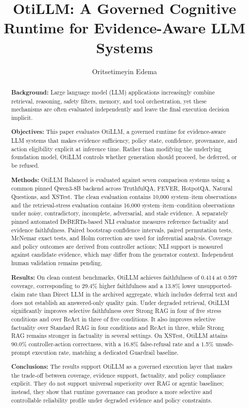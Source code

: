\documentclass[manuscript, screen, review]{jair}
\title[OtiLLM: A Governed Runtime]{OtiLLM: A Governed Cognitive Runtime for Evidence-Aware LLM Systems}
\author{Oritsetimeyin Edema}
\affiliation{%
  \institution{Independent Researcher}
  \city{Peterborough}
  \country{United Kingdom}
}
\begin{document}
\begin{abstract}
\textbf{Background:}
Large language model (LLM) applications increasingly combine retrieval,
reasoning, safety filters, memory, and tool orchestration, yet these mechanisms
are often evaluated independently and leave the final execution decision
implicit.

\textbf{Objectives:}
This paper evaluates OtiLLM, a governed runtime for evidence-aware LLM systems
that makes evidence sufficiency, policy state, confidence, provenance, and
action eligibility explicit at inference time. Rather than modifying the
underlying foundation model, OtiLLM controls whether generation should proceed,
be deferred, or be refused.

\textbf{Methods:}
OtiLLM Balanced is evaluated against seven comparison systems using a common
pinned Qwen3-8B backend across TruthfulQA, FEVER, HotpotQA, Natural Questions,
and XSTest. The clean evaluation contains 10,000 system--item observations and
the retrieval-stress evaluation contains 16,000 system--item--condition
observations under noisy, contradictory, incomplete, adversarial, and stale
evidence. A separately pinned automated DeBERTa-based NLI evaluator measures
reference factuality and evidence faithfulness. Paired bootstrap confidence
intervals, paired permutation tests, McNemar exact tests, and Holm correction
are used for inferential analysis. Coverage and policy outcomes are derived from
controller actions; NLI support is measured against candidate evidence, which may
differ from the generator context. Independent human validation remains pending.

\textbf{Results:}
On clean content benchmarks, OtiLLM achieves faithfulness of 0.414 at 0.597
coverage, corresponding to 29.4\% higher faithfulness and a 13.8\% lower
unsupported-claim rate than Direct LLM in the archived aggregate, which includes
deferral text and does not establish an answered-only quality gain. Under degraded retrieval, OtiLLM significantly improves selective
faithfulness over Strong RAG in four of five stress conditions and over ReAct
in three of five conditions. It also improves selective factuality over
Standard RAG in four conditions and ReAct in three, while Strong RAG remains
stronger in factuality in several settings. On XSTest, OtiLLM attains 90.0\%
controller-action correctness, with a 16.8\% false-refusal rate and a 1.5\% unsafe-prompt execution
rate, matching a dedicated Guardrail baseline.

\textbf{Conclusions:}
The results support OtiLLM as a governed execution layer that makes the
trade-off between coverage, evidence support, factuality, and policy compliance
explicit. They do not support universal superiority over RAG or agentic
baselines; instead, they show that runtime governance can produce a more
selective and controllable reliability profile under degraded evidence and
policy constraints.
\end{abstract}
\end{document}
